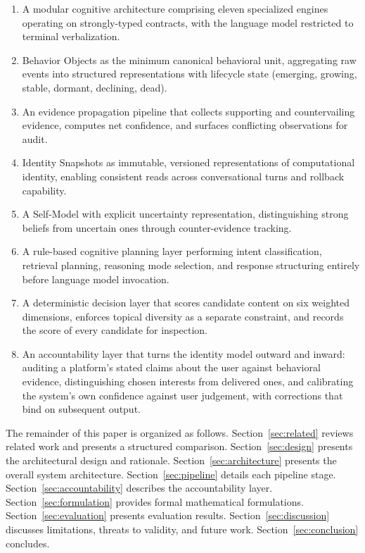 \documentclass[conference]{IEEEtran}
\begin{document}
\begin{enumerate}
\item A modular cognitive architecture comprising eleven specialized engines operating on strongly-typed contracts, with the language model restricted to terminal verbalization.
\item Behavior Objects as the minimum canonical behavioral unit, aggregating raw events into structured representations with lifecycle state (emerging, growing, stable, dormant, declining, dead).
\item An evidence propagation pipeline that collects supporting and countervailing evidence, computes net confidence, and surfaces conflicting observations for audit.
\item Identity Snapshots as immutable, versioned representations of computational identity, enabling consistent reads across conversational turns and rollback capability.
\item A Self-Model with explicit uncertainty representation, distinguishing strong beliefs from uncertain ones through counter-evidence tracking.
\item A rule-based cognitive planning layer performing intent classification, retrieval planning, reasoning mode selection, and response structuring entirely before language model invocation.
\item A deterministic decision layer that scores candidate content on six weighted dimensions, enforces topical diversity as a separate constraint, and records the score of every candidate for inspection.
\item An accountability layer that turns the identity model outward and inward: auditing a platform's stated claims about the user against behavioral evidence, distinguishing chosen interests from delivered ones, and calibrating the system's own confidence against user judgement, with corrections that bind on subsequent output.
\end{enumerate}

The remainder of this paper is organized as follows. Section~\ref{sec:related} reviews related work and presents a structured comparison. Section~\ref{sec:design} presents the architectural design and rationale. Section~\ref{sec:architecture} presents the overall system architecture. Section~\ref{sec:pipeline} details each pipeline stage. Section~\ref{sec:accountability} describes the accountability layer. Section~\ref{sec:formulation} provides formal mathematical formulations. Section~\ref{sec:evaluation} presents evaluation results. Section~\ref{sec:discussion} discusses limitations, threats to validity, and future work. Section~\ref{sec:conclusion} concludes.
\end{document}
